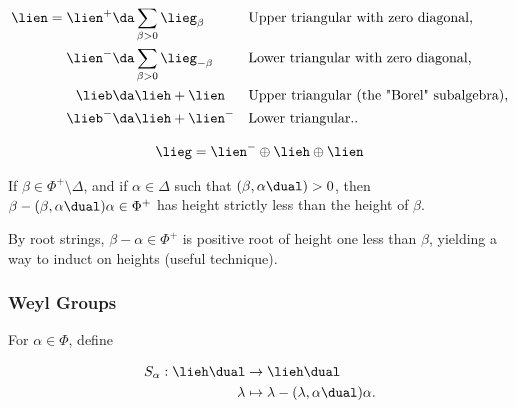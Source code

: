 \begin{proposition}

\begin{align*}  
\lien = \lien^+ &\da \sum_{\beta > 0} \lieg_\beta
&& \text{Upper triangular with zero diagonal,} \\
\lien^- &\da \sum_{\beta > 0} \lieg_{-\beta}
&& \text{Lower triangular with zero diagonal,} \\
\lieb &\da \lieh + \lien
&& \text{Upper triangular (the "Borel" subalgebra),} \\
\lieb^- &\da \lieh + \lien^-
&& \text{Lower triangular.} 
.\end{align*}

\end{proposition}

\begin{definition}

\begin{align*}
\lieg = \lien^- \oplus \lieh \oplus \lien
\end{align*}

\end{definition}

\begin{fact}

If \(\beta \in \Phi^+\setminus \Delta\), and if \(\alpha \in \Delta\)
such that \((\beta, \alpha\dual) > 0\), then
\(\beta - (\beta,\alpha\dual)\alpha \in \Phi^+\) has height strictly
less than the height of \(\beta\).

\end{fact}

\begin{remark}

By root strings, \(\beta-\alpha\in\Phi^+\) is positive root of height
one less than \(\beta\), yielding a way to induct on heights (useful
technique).

\end{remark}

\hypertarget{weyl-groups}{%
\subsubsection{Weyl Groups}\label{weyl-groups}}

For \(\alpha \in \Phi\), define

\begin{align*}
S_\alpha : \lieh\dual &\to \lieh\dual \\
\lambda &\mapsto \lambda - (\lambda, \alpha\dual)\alpha
.\end{align*}

